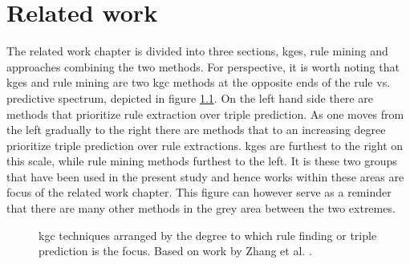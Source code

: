 \chapter{Related work}
\label{related_work}
The related work chapter is divided into three sections, \glspl{kge}, rule mining and approaches combining the two methods. For perspective, it is worth noting that \glspl{kge} and rule mining are two \gls{kgc} methods at the opposite ends of the rule vs. predictive spectrum, depicted in figure \ref{scale}. On the left hand side there are methods that prioritize rule extraction over triple prediction. As one moves from the left gradually to the right there are methods that to an increasing degree prioritize triple prediction over rule extractions. \glspl{kge} are furthest to the right on this scale, while rule mining methods furthest to the left. It is these two groups that have been used in the present study and hence works within these areas are focus of the related work chapter. This figure can however serve as a reminder that there are many other methods in the grey area between the two extremes. 

\begin{figure}[htbp]
\centering

\caption[KGC techniques]{\gls{kgc} techniques arranged by the degree to which rule finding or triple prediction is the focus. Based on work by Zhang et al. \cite{neuralsymbolic}.}
\label{scale}
\end{figure}


